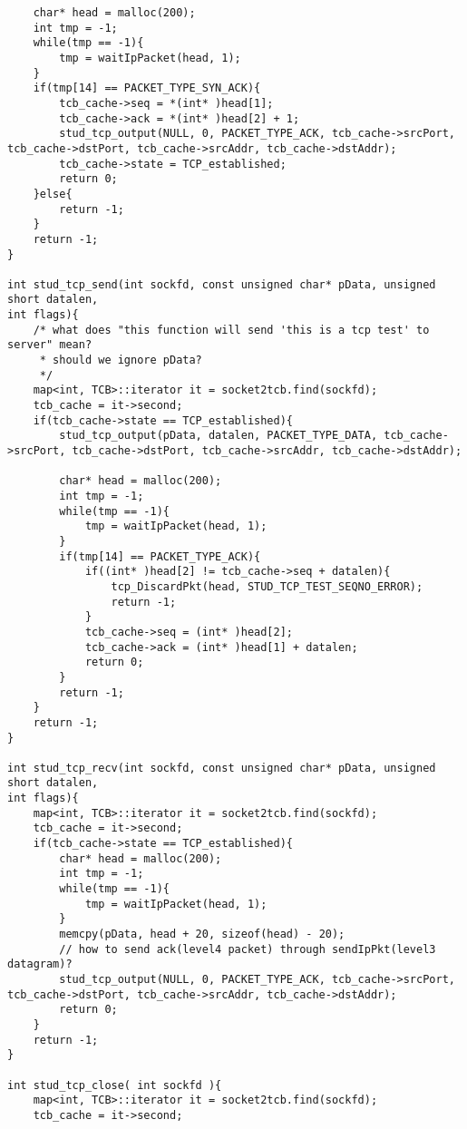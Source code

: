 \documentclass{article}
\begin{document}
\begin{lstlisting}
    char* head = malloc(200);
    int tmp = -1;
    while(tmp == -1){
        tmp = waitIpPacket(head, 1);
    }
    if(tmp[14] == PACKET_TYPE_SYN_ACK){
        tcb_cache->seq = *(int* )head[1];
        tcb_cache->ack = *(int* )head[2] + 1;
        stud_tcp_output(NULL, 0, PACKET_TYPE_ACK, tcb_cache->srcPort, tcb_cache->dstPort, tcb_cache->srcAddr, tcb_cache->dstAddr);
        tcb_cache->state = TCP_established;
        return 0;
    }else{
        return -1;
    }
    return -1;
}

int stud_tcp_send(int sockfd, const unsigned char* pData, unsigned short datalen,
int flags){
    /* what does "this function will send 'this is a tcp test' to server" mean?
     * should we ignore pData?
     */
    map<int, TCB>::iterator it = socket2tcb.find(sockfd);
    tcb_cache = it->second;
    if(tcb_cache->state == TCP_established){
        stud_tcp_output(pData, datalen, PACKET_TYPE_DATA, tcb_cache->srcPort, tcb_cache->dstPort, tcb_cache->srcAddr, tcb_cache->dstAddr);

        char* head = malloc(200);
        int tmp = -1;
        while(tmp == -1){
            tmp = waitIpPacket(head, 1);
        }
        if(tmp[14] == PACKET_TYPE_ACK){
            if((int* )head[2] != tcb_cache->seq + datalen){
                tcp_DiscardPkt(head, STUD_TCP_TEST_SEQNO_ERROR);
                return -1;
            }
            tcb_cache->seq = (int* )head[2];
            tcb_cache->ack = (int* )head[1] + datalen;
            return 0;
        }
        return -1;
    }
    return -1;
}

int stud_tcp_recv(int sockfd, const unsigned char* pData, unsigned short datalen,
int flags){
    map<int, TCB>::iterator it = socket2tcb.find(sockfd);
    tcb_cache = it->second;
    if(tcb_cache->state == TCP_established){
        char* head = malloc(200);
        int tmp = -1;
        while(tmp == -1){
            tmp = waitIpPacket(head, 1);
        }
        memcpy(pData, head + 20, sizeof(head) - 20);
        // how to send ack(level4 packet) through sendIpPkt(level3 datagram)?
        stud_tcp_output(NULL, 0, PACKET_TYPE_ACK, tcb_cache->srcPort, tcb_cache->dstPort, tcb_cache->srcAddr, tcb_cache->dstAddr);
        return 0;
    }
    return -1;
}

int stud_tcp_close( int sockfd ){
    map<int, TCB>::iterator it = socket2tcb.find(sockfd);
    tcb_cache = it->second;


\end{lstlisting}
\end{document}
